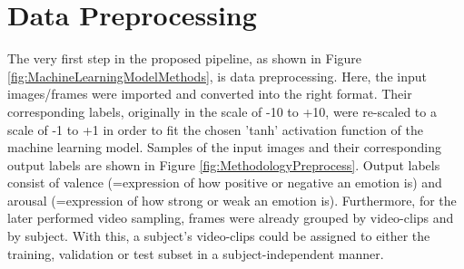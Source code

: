 \section{Data Preprocessing}
The very first step in the proposed pipeline, as shown in Figure \ref{fig:MachineLearningModelMethods}, is data preprocessing. Here, the input images/frames were imported and converted into the right format. Their corresponding labels, originally in the scale of -10 to +10, were re-scaled to a scale of -1 to +1 in order to fit the chosen 'tanh' activation function of the machine learning model.
\newline\newline
Samples of the input images and their corresponding output labels are shown in Figure \ref{fig:MethodologyPreprocess}. Output labels consist of valence (=expression of how positive or negative an emotion is) and arousal (=expression of how strong or weak an emotion is).
\newline\newline
Furthermore, for the later performed video sampling, frames were already grouped by video-clips and by subject. With this, a subject's video-clips could be assigned to either the training, validation or test subset in a subject-independent manner. 

